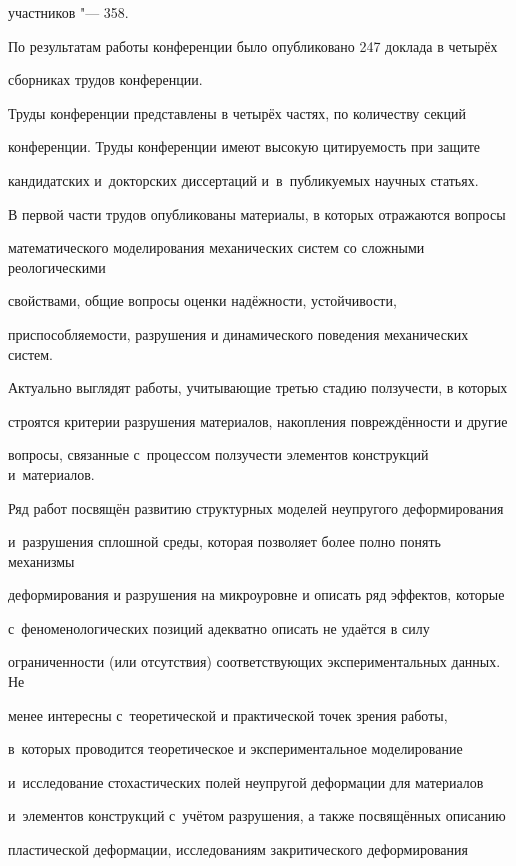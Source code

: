 участников "--- 358.



По результатам работы конференции было опубликовано 247 доклада в четырёх 

сборниках трудов конференции.



Труды конференции представлены в четырёх частях, по количеству секций 

конференции. Труды конференции имеют высокую цитируемость при защите 

кандидатских и~докторских диссертаций и~в~публикуемых научных статьях. 



В первой части трудов опубликованы материалы, в которых отражаются вопросы 

математического моделирования механических систем со сложными реологическими 

свойствами, общие вопросы оценки надёжности, устойчивости, 

приспособляемости, разрушения и динамического поведения механических систем. 

Актуально выглядят работы, учитывающие третью стадию ползучести, в которых 

строятся критерии разрушения материалов, накопления повреждённости и другие 

вопросы, связанные с~процессом ползучести элементов конструкций и~материалов.



Ряд работ посвящён развитию структурных моделей неупругого деформирования 

и~разрушения сплошной среды, которая позволяет более полно понять механизмы 

деформирования и разрушения на микроуровне и описать ряд эффектов, которые 

с~феноменологических позиций адекватно описать не удаётся в силу 

ограниченности (или отсутствия) соответствующих экспериментальных данных. Не 

менее интересны с~теоретической и практической точек зрения работы, 

в~которых проводится теоретическое и экспериментальное моделирование 

и~исследование стохастических полей неупругой деформации для материалов 

и~элементов конструкций с~учётом разрушения, а также посвящённых описанию 

пластической деформации, исследованиям закритического деформирования 

